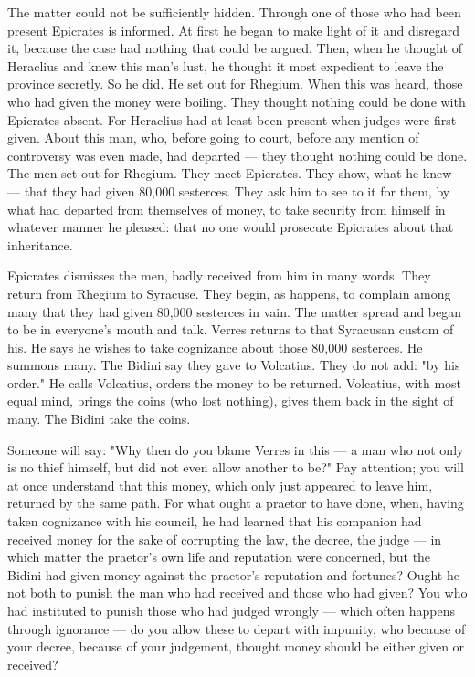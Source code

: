  The matter could not be sufficiently hidden. Through one of those who had been present Epicrates is informed. At first he began to make light of it and disregard it, because the case had nothing that could be argued. Then, when he thought of Heraclius and knew this man's lust, he thought it most expedient to leave the province secretly. So he did. He set out for Rhegium. When this was heard, those who had given the money were boiling. They thought nothing could be done with Epicrates absent. For Heraclius had at least been present when judges were first given. About this man, who, before going to court, before any mention of controversy was even made, had departed --- they thought nothing could be done. The men set out for Rhegium. They meet Epicrates. They show, what he knew --- that they had given 80,000 sesterces. They ask him to see to it for them, by what had departed from themselves of money, to take security from himself in whatever manner he pleased: that no one would prosecute Epicrates about that inheritance.

 Epicrates dismisses the men, badly received from him in many words. They return from Rhegium to Syracuse. They begin, as happens, to complain among many that they had given 80,000 sesterces in vain. The matter spread and began to be in everyone's mouth and talk. Verres returns to that Syracusan custom of his. He says he wishes to take cognizance about those 80,000 sesterces. He summons many. The Bidini say they gave to Volcatius. They do not add: "by his order." He calls Volcatius, orders the money to be returned. Volcatius, with most equal mind, brings the coins (who lost nothing), gives them back in the sight of many. The Bidini take the coins.

 Someone will say: "Why then do you blame Verres in this --- a man who not only is no thief himself, but did not even allow another to be?" Pay attention; you will at once understand that this money, which only just appeared to leave him, returned by the same path. For what ought a praetor to have done, when, having taken cognizance with his council, he had learned that his companion had received money for the sake of corrupting the law, the decree, the judge --- in which matter the praetor's own life and reputation were concerned, but the Bidini had given money against the praetor's reputation and fortunes? Ought he not both to punish the man who had received and those who had given? You who had instituted to punish those who had judged wrongly --- which often happens through ignorance --- do you allow these to depart with impunity, who because of your decree, because of your judgement, thought money should be either given or received?

